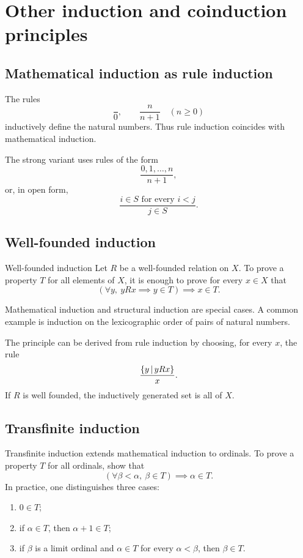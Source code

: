 \documentclass[a4paper]{article}
\begin{document}
\section{Other induction and coinduction principles}

\subsection{Mathematical induction as rule induction}

The rules
\[
    \frac{}{0},
    \qquad
    \frac{n}{n+1}
    \quad(n\geq0)
\]
inductively define the natural numbers.
Thus rule induction coincides with mathematical induction.

The strong variant uses rules of the form
\[
    \frac{0,1,\ldots,n}{n+1},
\]
or, in open form,
\[
    \frac{i\in S\text{ for every }i<j}{j\in S}.
\]

\subsection{Well-founded induction}

\begin{snippettheorem}{Well-founded induction}
    Let \(R\) be a well-founded relation on \(X\).
    To prove a property \(T\) for all elements of \(X\), it is enough to prove for every \(x\in X\) that
    \[
        \left(\forall y,\ yRx\implies y\in T\right)
        \implies
        x\in T.
    \]
\end{snippettheorem}

Mathematical induction and structural induction are special cases.
A common example is induction on the lexicographic order of pairs of natural numbers.

The principle can be derived from rule induction by choosing, for every \(x\), the rule
\[
    \frac{\{y\,|\, yRx\}}{x}.
\]
If \(R\) is well founded, the inductively generated set is all of \(X\).

\subsection{Transfinite induction}

Transfinite induction extends mathematical induction to ordinals.
To prove a property \(T\) for all ordinals, show that
\[
    \left(\forall\beta<\alpha,\ \beta\in T\right)
    \implies
    \alpha\in T.
\]
In practice, one distinguishes three cases:
\begin{enumerate}
    \item \(0\in T\);
    \item if \(\alpha\in T\), then \(\alpha+1\in T\);
    \item if \(\beta\) is a limit ordinal and \(\alpha\in T\) for every \(\alpha<\beta\), then \(\beta\in T\).
\end{enumerate}
\end{document}
